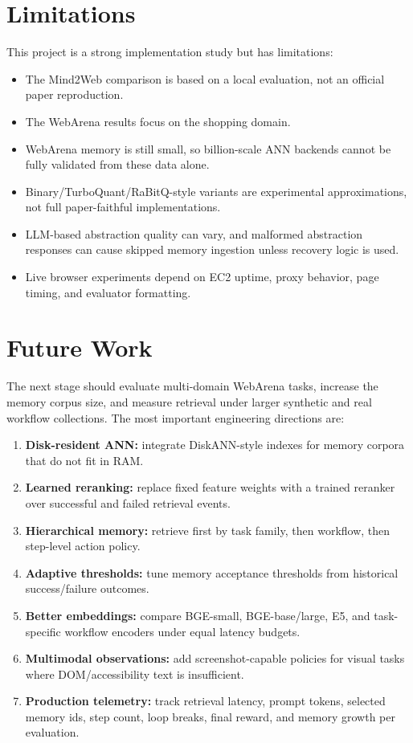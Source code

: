 \documentclass[11pt]{article}
\begin{document}
\section{Limitations}

This project is a strong implementation study but has limitations:
\begin{itemize}[leftmargin=*]
  \item The Mind2Web comparison is based on a local evaluation, not an official paper reproduction.
  \item The WebArena results focus on the shopping domain.
  \item WebArena memory is still small, so billion-scale ANN backends cannot be fully validated from these data alone.
  \item Binary/TurboQuant/RaBitQ-style variants are experimental approximations, not full paper-faithful implementations.
  \item LLM-based abstraction quality can vary, and malformed abstraction responses can cause skipped memory ingestion unless recovery logic is used.
  \item Live browser experiments depend on EC2 uptime, proxy behavior, page timing, and evaluator formatting.
\end{itemize}

\section{Future Work}

The next stage should evaluate multi-domain WebArena tasks, increase the memory corpus size, and measure retrieval under larger synthetic and real workflow collections. The most important engineering directions are:
\begin{enumerate}[leftmargin=*]
  \item \textbf{Disk-resident ANN:} integrate DiskANN-style indexes for memory corpora that do not fit in RAM.
  \item \textbf{Learned reranking:} replace fixed feature weights with a trained reranker over successful and failed retrieval events.
  \item \textbf{Hierarchical memory:} retrieve first by task family, then workflow, then step-level action policy.
  \item \textbf{Adaptive thresholds:} tune memory acceptance thresholds from historical success/failure outcomes.
  \item \textbf{Better embeddings:} compare BGE-small, BGE-base/large, E5, and task-specific workflow encoders under equal latency budgets.
  \item \textbf{Multimodal observations:} add screenshot-capable policies for visual tasks where DOM/accessibility text is insufficient.
  \item \textbf{Production telemetry:} track retrieval latency, prompt tokens, selected memory ids, step count, loop breaks, final reward, and memory growth per evaluation.
\end{enumerate}
\end{document}
